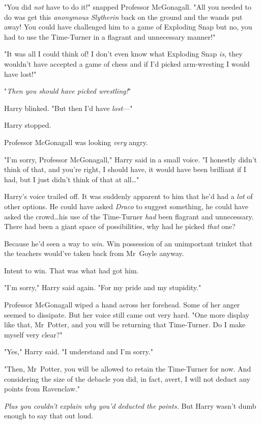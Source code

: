 "You did \emph{not} have to do it!" snapped Professor McGonagall. "All you
needed to do was get this \emph{anonymous Slytherin} back on the ground and the
wands put away! You could have challenged him to a game of Exploding Snap but
no, you had to use the Time-Turner in a flagrant and unnecessary manner!"

"It was all I could think of! I don’t even know what Exploding Snap \emph{is,}
they wouldn’t have accepted a game of chess and if I’d picked arm-wresting I
would have lost!"

"\emph{Then you should have picked wrestling!}"

Harry blinked. "But then I’d have \emph{lost}—"

Harry stopped.

Professor McGonagall was looking \emph{very} angry.

"I’m sorry, Professor McGonagall," Harry said in a small voice. "I honestly
didn’t think of that, and you’re right, I should have, it would have been
brilliant if I had, but I just didn’t think of that at all…"

Harry’s voice trailed off. It was suddenly apparent to him that he’d had a
\emph{lot} of other options. He could have asked \emph{Draco} to suggest
something, he could have asked the crowd…his use of the Time-Turner
\emph{had} been flagrant and unnecessary. There had been a giant space of
possibilities, why had he picked \emph{that} one?

Because he’d seen a way to \emph{win.} Win possession of an unimportant trinket
that the teachers would’ve taken back from Mr~Goyle anyway.

Intent to win. That was what had got him.

"I’m sorry," Harry said again. "For my pride and my stupidity."

Professor McGonagall wiped a hand across her forehead. Some of her anger seemed
to dissipate. But her voice still came out very hard. "One more display like
that, Mr~Potter, and you will be returning that Time-Turner. Do I make myself
very clear?"

"Yes," Harry said. "I understand and I’m sorry."

"Then, Mr~Potter, you will be allowed to retain the Time-Turner for now. And
considering the size of the debacle you did, in fact, avert, I will not deduct
any points from Ravenclaw."

\emph{Plus you couldn’t explain why you’d deducted the points.} But Harry
wasn’t dumb enough to say that out loud.

